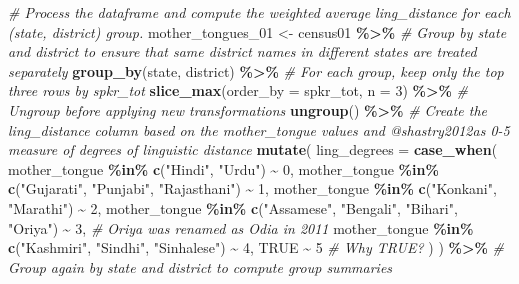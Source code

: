 \documentclass[
]{article}
\newenvironment{Shaded}{\begin{snugshade}}{\end{snugshade}}
\newcommand{\AttributeTok}[1]{\textcolor[rgb]{0.13,0.29,0.53}{#1}}
\newcommand{\CommentTok}[1]{\textcolor[rgb]{0.56,0.35,0.01}{\textit{#1}}}
\newcommand{\ConstantTok}[1]{\textcolor[rgb]{0.56,0.35,0.01}{#1}}
\newcommand{\DecValTok}[1]{\textcolor[rgb]{0.00,0.00,0.81}{#1}}
\newcommand{\FunctionTok}[1]{\textcolor[rgb]{0.13,0.29,0.53}{\textbf{#1}}}
\newcommand{\NormalTok}[1]{#1}
\newcommand{\OtherTok}[1]{\textcolor[rgb]{0.56,0.35,0.01}{#1}}
\newcommand{\SpecialCharTok}[1]{\textcolor[rgb]{0.81,0.36,0.00}{\textbf{#1}}}
\newcommand{\StringTok}[1]{\textcolor[rgb]{0.31,0.60,0.02}{#1}}
\begin{document}
\begin{Shaded}
\begin{Highlighting}[]
\CommentTok{\# Process the dataframe and compute the weighted average ling\_distance for each (state, district) group.}
\NormalTok{mother\_tongues\_01 }\OtherTok{\textless{}{-}}\NormalTok{ census01 }\SpecialCharTok{\%\textgreater{}\%}
  \CommentTok{\# Group by state and district to ensure that same district names in different states are treated separately}
  \FunctionTok{group\_by}\NormalTok{(state, district) }\SpecialCharTok{\%\textgreater{}\%}
  \CommentTok{\# For each group, keep only the top three rows by spkr\_tot}
  \FunctionTok{slice\_max}\NormalTok{(}\AttributeTok{order\_by =}\NormalTok{ spkr\_tot, }\AttributeTok{n =} \DecValTok{3}\NormalTok{) }\SpecialCharTok{\%\textgreater{}\%}
  \CommentTok{\# Ungroup before applying new transformations}
  \FunctionTok{ungroup}\NormalTok{() }\SpecialCharTok{\%\textgreater{}\%}
  \CommentTok{\# Create the ling\_distance column based on the mother\_tongue values and @shastry2012a\textquotesingle{}s 0{-}5 measure of degrees of linguistic distance}
  \FunctionTok{mutate}\NormalTok{(}
    \AttributeTok{ling\_degrees =} \FunctionTok{case\_when}\NormalTok{(}
\NormalTok{      mother\_tongue }\SpecialCharTok{\%in\%} \FunctionTok{c}\NormalTok{(}\StringTok{"Hindi"}\NormalTok{, }\StringTok{"Urdu"}\NormalTok{) }\SpecialCharTok{\textasciitilde{}} \DecValTok{0}\NormalTok{,}
\NormalTok{      mother\_tongue }\SpecialCharTok{\%in\%} \FunctionTok{c}\NormalTok{(}\StringTok{"Gujarati"}\NormalTok{, }\StringTok{"Punjabi"}\NormalTok{, }\StringTok{"Rajasthani"}\NormalTok{) }\SpecialCharTok{\textasciitilde{}} \DecValTok{1}\NormalTok{,}
\NormalTok{      mother\_tongue }\SpecialCharTok{\%in\%} \FunctionTok{c}\NormalTok{(}\StringTok{"Konkani"}\NormalTok{, }\StringTok{"Marathi"}\NormalTok{) }\SpecialCharTok{\textasciitilde{}} \DecValTok{2}\NormalTok{,}
\NormalTok{      mother\_tongue }\SpecialCharTok{\%in\%} \FunctionTok{c}\NormalTok{(}\StringTok{"Assamese"}\NormalTok{, }\StringTok{"Bengali"}\NormalTok{, }\StringTok{"Bihari"}\NormalTok{, }\StringTok{"Oriya"}\NormalTok{) }\SpecialCharTok{\textasciitilde{}} \DecValTok{3}\NormalTok{, }\CommentTok{\# Oriya was renamed as Odia in 2011}
\NormalTok{      mother\_tongue }\SpecialCharTok{\%in\%} \FunctionTok{c}\NormalTok{(}\StringTok{"Kashmiri"}\NormalTok{, }\StringTok{"Sindhi"}\NormalTok{, }\StringTok{"Sinhalese"}\NormalTok{) }\SpecialCharTok{\textasciitilde{}} \DecValTok{4}\NormalTok{,}
      \ConstantTok{TRUE} \SpecialCharTok{\textasciitilde{}} \DecValTok{5} \CommentTok{\# Why TRUE?}
\NormalTok{    )}
\NormalTok{  ) }\SpecialCharTok{\%\textgreater{}\%}
  \CommentTok{\# Group again by state and district to compute group summaries}

\end{Highlighting}
\end{Shaded}
\end{document}
